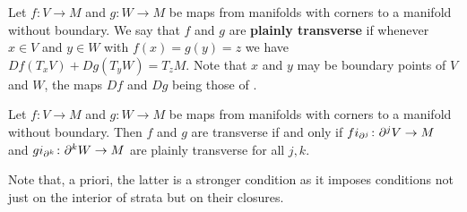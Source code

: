 \begin{definition}\label{D: plain transversality}
Let $f \colon V \to M$ and $g \colon W \to M$ be maps from manifolds with corners to a manifold without boundary.
We say that $f$ and $g$ are \textbf{plainly transverse} if whenever $x \in V$ and $y\in W$ with $f(x) = g(y) = z$ we have $Df(T_xV)+Dg(T_yW) = T_z M$. Note that $x$ and $y$ may be boundary points of $V$ and $W$, the maps $Df$ and $Dg$ being those of \cite[Definition 3.2]{Joy12}.
\end{definition}

\begin{comment}
To be explicit in the case that $x \in V-S^0(V)$ or $y \in W-S^0(W)$ with $f(x) = g(y)$, let $(U_x,\phi_x)$ and $(U_y,\phi_y)$ be charts with $\phi_x(0) = x$ and $\phi_y(0) = y$.
By definition of smoothness, there exist neighborhoods $N_x$ and $N_y$ of $0$ in $\R^v$ and $\R^w$, respectively, so that $f\phi_x$ and $g\phi_y$ extend to smooth maps $\psi_x \colon N_x \to M$ and $\psi_y \colon N_y \to M$.
Then $f$ and $g$ are plainly transverse at $x$ and $y$ if $D\psi_x(T_0 \R^v)+D\psi_y(T_0\R^w) = T_{f(x)}M$.
This property is independent of the involved choices as $D\psi_x(T_0 \R^v)$ is the limit of $D\psi_x(T_{a} \R^v)$ for $a$ taken along any smooth path in $U_x$, and this does not depend on the choice of $N_x$ or $\psi_x$, and similarly for $\psi_y$.
\end{comment}

\begin{lemma}\label{L: simple trans}
	Let $f \colon V \to M$ and $g \colon W \to M$ be maps from manifolds with corners to a manifold without boundary.
	Then $f$ and $g$ are transverse if and only if $fi_{\partial^j} \colon \partial^jV \to M$ and $gi_{\partial^k} \colon \partial^kW \to M$ are plainly transverse for all $j,k$.
\end{lemma}

Note that, a priori, the latter is a stronger condition as it imposes conditions not just on the interior of strata but on their closures.

